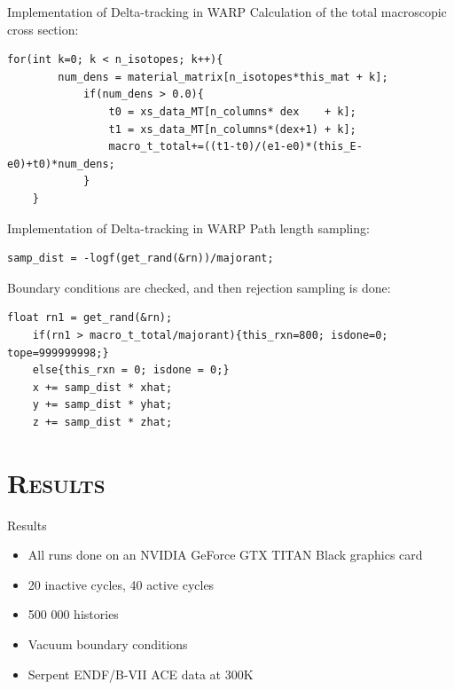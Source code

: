 \documentclass[xcolor=x11names, compress, handout]{beamer}
\renewcommand{\(}{\begin{columns}}
\renewcommand{\)}{\end{columns}}
\newcommand{\<}[1]{\begin{column}{#1}}
\renewcommand{\>}{\end{column}}
\begin{document}
\begin{frame}[fragile]{Implementation of Delta-tracking in WARP}
	Calculation of the total macroscopic cross section:
	\vspace{5 mm}
	\pause
	\begin{Verbatim}[fontsize=\footnotesize]
	for(int k=0; k < n_isotopes; k++){
	    num_dens = material_matrix[n_isotopes*this_mat + k];
	        if(num_dens > 0.0){
	            t0 = xs_data_MT[n_columns* dex    + k];
	            t1 = xs_data_MT[n_columns*(dex+1) + k];
	            macro_t_total+=((t1-t0)/(e1-e0)*(this_E-e0)+t0)*num_dens;
	        }
	}
	\end{Verbatim}
\end{frame}


\begin{frame}[fragile]{Implementation of Delta-tracking in WARP}
	Path length sampling:
	\vspace{2 mm}
	\pause
	\begin{Verbatim}[fontsize=\footnotesize]
	samp_dist = -logf(get_rand(&rn))/majorant;
	\end{Verbatim}
	\pause
	\vspace{2 mm}
	Boundary conditions are checked, and then rejection sampling is done:
	\pause
	\vspace{2 mm}
	\begin{Verbatim}[fontsize=\footnotesize]
	float rn1 = get_rand(&rn);
	if(rn1 > macro_t_total/majorant){this_rxn=800; isdone=0; tope=999999998;}
	else{this_rxn = 0; isdone = 0;}
	x += samp_dist * xhat;
	y += samp_dist * yhat;
	z += samp_dist * zhat;
	\end{Verbatim}
\end{frame}


\section{\scshape Results}
\begin{frame}{Results}
	\begin{itemize}
	\item{All runs done on an NVIDIA GeForce GTX TITAN Black graphics card}
	\pause
	\item{20 inactive cycles, 40 active cycles}
	\pause
	\item{500 000 histories}
	\pause
	\item{Vacuum boundary conditions}
	\pause
	\item{Serpent ENDF/B-VII ACE data at 300K}
	\end{itemize}
\end{frame}
\end{document}
